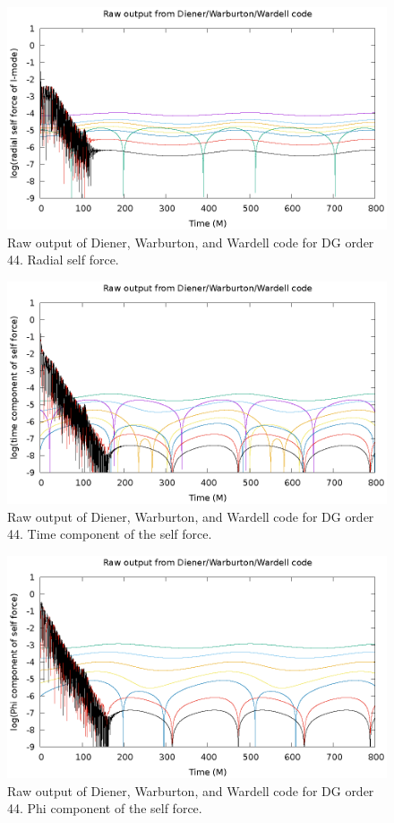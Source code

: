 \begin{figure}
  \includegraphics{rawRadialSelForceModes}
  \caption{Raw output of Diener, Warburton, and Wardell code for DG order 44. Radial self force.}
\end{figure}

\begin{figure}
  \includegraphics{rawTimeSelfForceModes}
  \caption{Raw output of Diener, Warburton, and Wardell code for DG order 44. Time component of the self force.}
\end{figure}

\begin{figure}
  \includegraphics{rawPhiSelfForceModes}
  \caption{Raw output of Diener, Warburton, and Wardell code for DG order 44. Phi component of the self force.}
\end{figure}

